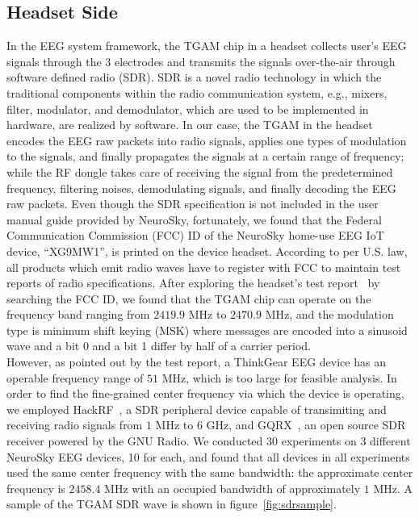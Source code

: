 \subsection{Headset Side}
In the EEG system framework, the TGAM chip in a headset collects user's EEG signals through the 3 electrodes and transmits the signals over-the-air through software defined radio (SDR). SDR is a novel radio technology in which the traditional components within the radio communication system, e.g., mixers, filter, modulator, and demodulator, which are used to be implemented in hardware, are realized by software. In our case, the TGAM in the headset encodes the EEG raw packets into radio signals, applies one types of modulation to the signals, and finally propagates the signals at a certain range of frequency; while the RF dongle takes care of receiving the signal from the predetermined frequency, filtering noises, demodulating signals, and finally decoding the EEG raw packets. Even though the SDR specification is not included in the user manual guide provided by NeuroSky, fortunately, we found that the Federal Communication Commission (FCC) ID of the NeuroSky home-use EEG IoT device, ``XG9MW1'', is printed on the device headset. According to per U.S. law, all products which emit radio waves have to register with FCC to maintain test reports of radio specifications. After exploring the headset's test report~\cite{testreport} by searching the FCC ID, we found that the TGAM chip can operate on the frequency band ranging from $2419.9$ MHz to $2470.9$ MHz, and the modulation type is minimum shift keying (MSK) where messages are encoded into a sinusoid wave and a bit 0 and a bit 1 differ by half of a carrier period. %
\\
%
\indent However, as pointed out by the test report, a ThinkGear EEG device has an operable frequency range of $51$ MHz, which is too large for feasible analysis. In order to find the fine-grained center frequency via which the device is operating, we employed HackRF~\cite{gadgetshackrf}, a SDR peripheral device capable of transimiting and receiving radio signals from $1$ MHz to $6$ GHz, and GQRX~\cite{gqrx}, an open source SDR receiver powered by the GNU Radio. We conducted 30 experiments on 3 different NeuroSky EEG devices, 10 for each, and found that all devices in all experiments used the same center frequency with the same bandwidth: the approximate center frequency is $2458.4$ MHz with an occupied bandwidth of approximately $1$ MHz. A sample of the TGAM SDR wave is shown in figure~\ref{fig:sdrsample}.\\
